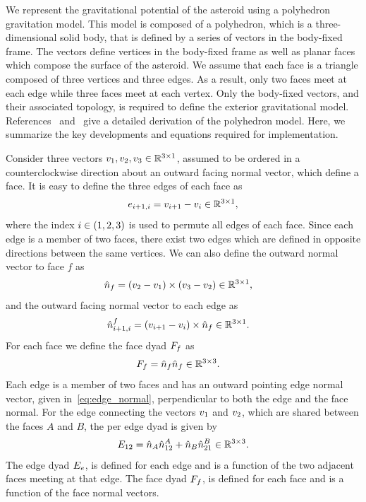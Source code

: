 \documentclass[letterpaper, paper,11pt]{AAS}		%
\begin{document}
We represent the gravitational potential of the asteroid using a polyhedron gravitation model.
This model is composed of a polyhedron, which is a three-dimensional solid body, that is defined by a series of vectors in the body-fixed frame.
The vectors define vertices in the body-fixed frame as well as planar faces which compose the surface of the asteroid.
We assume that each face is a triangle composed of three vertices and three edges.
As a result, only two faces meet at each edge while three faces meet at each vertex.
Only the body-fixed vectors, and their associated topology, is required to define the exterior gravitational model.
References~\cite{werner1994} and~\cite{werner1996} give a detailed derivation of the polyhedron model.
Here, we summarize the key developments and equations required for implementation.

Consider three vectors \( v_1, v_2, v_3 \in \mathbb{R}^{3 \times 1} \), assumed to be ordered in a counterclockwise direction about an outward facing normal vector, which define a face.
It is easy to define the three edges of each face as
\begin{align}\label{eq:edges}
    e_{i+1,i} = v_{i+1} - v_i \in \mathbb{R}^{3 \times 1 },
\end{align}
where the index \( i \in \left( 1,2,3 \right) \) is used to permute all edges of each face.
Since each edge is a member of two faces, there exist two edges which are defined in opposite directions between the same vertices.
We can also define the outward normal vector to face \( f\)  as
\begin{align}\label{eq:face_normal}
    \hat{n}_f &= \left( v_{2} - v_1 \right) \times \left( v_{3} - v_2 \right) \in \mathbb{R}^{3 \times 1},
\end{align}
and the outward facing normal vector to each edge as
\begin{align}\label{eq:edge_normal}
    \hat{n}_{i+1,i}^f &= \left( v_{i+1} - v_i \right) \times \hat{n}_f \in \mathbb{R}^{3 \times 1}.
\end{align}
For each face we define the face dyad \( F_f \) as
\begin{align}\label{eq:face_dyad}
    F_f &= \hat{n}_f \hat{n}_f \in \mathbb{R}^{3 \times 3}.
\end{align}
Each edge is a member of two faces and has an outward pointing edge normal vector, given in~\cref{eq:edge_normal}, perpendicular to both the edge and the face normal.
For the edge connecting the vectors \( v_1 \) and \( v_2 \), which are shared between the faces \(A\) and \( B\), the per edge dyad is given by
\begin{align}\label{eq:edge_dyad}
    E_{12} = \hat{n}_A \hat{n}_{12}^A + \hat{n}_B \hat{n}_{21}^B \in \mathbb{R}^{3 \times 3}.
\end{align}
The edge dyad \( E_e  \), is defined for each edge and is a function of the two adjacent faces meeting at that edge.
The face dyad \( F_f \), is defined for each face and is a function of the face normal vectors.
\end{document}
